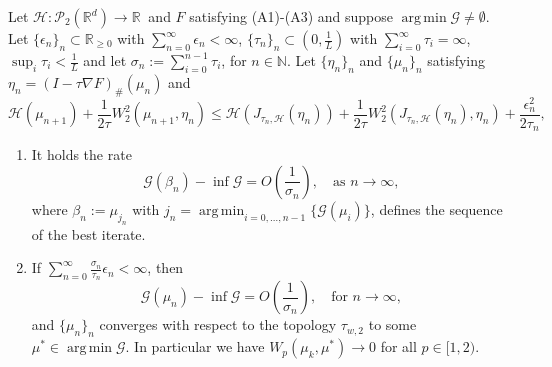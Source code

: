 \documentclass[10pt,a4paper]{amsart}
\DeclareMathOperator*{\argmin}{arg\,min}
\newcommand{\R}{\mathbb{R}}
\newcommand{\cG}{\mathcal{G}}
\newcommand{\cP}{\mathcal{P}}
\begin{document}
\begin{theorem}\label{thm:PG_convergence2}
	Let $\mathcal{H} : \cP_2(\R^d) \to \mathbb{R} \ $ and $F$ satisfying (A1)-(A3) and suppose $\argmin \cG \neq \emptyset$. Let $\{\epsilon_n\}_n\subset \mathbb{R}_{\geq 0}$ with $\sum_{n=0}^{\infty} \epsilon_n < \infty$, $\{\tau_n\}_n \subset \left(0,\frac{1}{L}\right)$ with $\sum_{i=0}^{\infty}\tau_i= \infty$, $\sup_i \tau_i < \frac{1}{L}$ and let $\sigma_n:= \sum_{i=0}^{n-1}\tau_i$, for $n\in\mathbb{N}$. Let $\{\eta_n\}_n$ and $\{\mu_n\}_n$ satisfying $\eta_{n}=(I-\tau \nabla F)_{\#}(\mu_n)$ and
	\begin{equation}\label{eq:second_error_final}
		\mathcal{H}(\mu_{n+1})+\frac{1}{2\tau}W_2^2(\mu_{n+1},\eta_{n})\leq \mathcal{H}(J_{\tau_n,\mathcal{H}}(\eta_{n}))+\frac{1}{2\tau}W_2^2(J_{\tau_n,\mathcal{H}}(\eta_{n}),\eta_{n})+ \frac{\epsilon_n^2}{2\tau_n},
	\end{equation}
	\begin{enumerate}
		\item It holds the rate
		\begin{equation}\label{eq:rate_PG_bar2}
			\cG(\beta_n)-\inf \cG = O\left(\frac{1}{\sigma_n}\right), \quad \text{as } n\to \infty,
		\end{equation}
		where $\beta_n := \mu_{j_n}$ with $j_n = \argmin_{i=0,\dots,n-1}\{\cG(\mu_i)\}$, defines the sequence of the best iterate.
		\item If $\sum_{n=0}^{\infty}\frac{\sigma_n}{\tau_n}\epsilon_{n}  < \infty$, then \[\cG(\mu_n)-\inf \cG = O\left(\frac{1}{\sigma_n}\right), \quad \text{for } n\to \infty,\] and $\{\mu_n\}_n$ converges with respect to the topology $\tau_{w,2}$ to some $\mu^*\in \argmin \cG$. In particular we have $W_p(\mu_k,\mu^*)\to 0$ for all $p\in[1,2)$.
	\end{enumerate}
\end{theorem}
\end{document}

